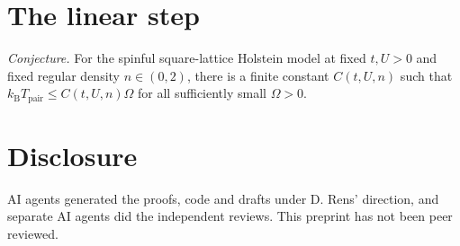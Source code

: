 \documentclass[11pt]{article}
\newcommand{\kb}{k_{\mathrm B}}
\newcommand{\Tpair}{T_{\mathrm{pair}}}
\begin{document}
\section{The linear step}

\noindent\textit{Conjecture.} For the spinful square-lattice Holstein model at fixed $t,U>0$ and fixed regular density $n\in(0,2)$, there is a finite constant $C(t,U,n)$ such that $\kb\Tpair\leq C(t,U,n)\Omega$ for all sufficiently small $\Omega>0$.

\section*{Disclosure}

AI agents generated the proofs, code and drafts under D. Rens' direction, and separate AI agents did the independent reviews. This preprint has not been peer reviewed.

{\footnotesize
{}


}
\end{document}
